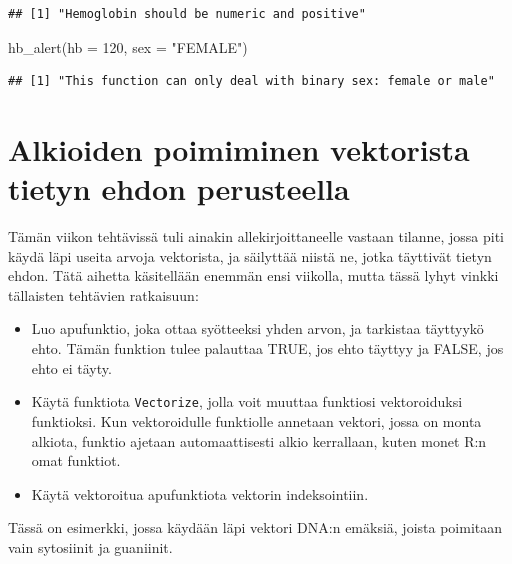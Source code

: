 \documentclass[
]{book}
\newenvironment{Shaded}{\begin{snugshade}}{\end{snugshade}}
\newcommand{\AttributeTok}[1]{\textcolor[rgb]{0.77,0.63,0.00}{#1}}
\newcommand{\DecValTok}[1]{\textcolor[rgb]{0.00,0.00,0.81}{#1}}
\newcommand{\FunctionTok}[1]{\textcolor[rgb]{0.00,0.00,0.00}{#1}}
\newcommand{\NormalTok}[1]{#1}
\newcommand{\StringTok}[1]{\textcolor[rgb]{0.31,0.60,0.02}{#1}}
\providecommand{\tightlist}{%
  \setlength{\itemsep}{0pt}\setlength{\parskip}{0pt}}
\begin{document}
\begin{verbatim}
## [1] "Hemoglobin should be numeric and positive"
\end{verbatim}

\begin{Shaded}
\begin{Highlighting}[]
\FunctionTok{hb\_alert}\NormalTok{(}\AttributeTok{hb =} \DecValTok{120}\NormalTok{, }\AttributeTok{sex =} \StringTok{"FEMALE"}\NormalTok{)}
\end{Highlighting}
\end{Shaded}

\begin{verbatim}
## [1] "This function can only deal with binary sex: female or male"
\end{verbatim}

\hypertarget{alkioiden-poimiminen-vektorista-tietyn-ehdon-perusteella}{%
\section{Alkioiden poimiminen vektorista tietyn ehdon perusteella}\label{alkioiden-poimiminen-vektorista-tietyn-ehdon-perusteella}}

Tämän viikon tehtävissä tuli ainakin allekirjoittaneelle vastaan tilanne, jossa piti käydä läpi useita arvoja vektorista, ja säilyttää niistä ne, jotka täyttivät tietyn ehdon. Tätä aihetta käsitellään enemmän ensi viikolla, mutta tässä lyhyt vinkki tällaisten tehtävien ratkaisuun:

\begin{itemize}
\tightlist
\item
  Luo apufunktio, joka ottaa syötteeksi yhden arvon, ja tarkistaa täyttyykö ehto. Tämän funktion tulee palauttaa TRUE, jos ehto täyttyy ja FALSE, jos ehto ei täyty.
\item
  Käytä funktiota \texttt{Vectorize}, jolla voit muuttaa funktiosi vektoroiduksi funktioksi. Kun vektoroidulle funktiolle annetaan vektori, jossa on monta alkiota, funktio ajetaan automaattisesti alkio kerrallaan, kuten monet R:n omat funktiot.
\item
  Käytä vektoroitua apufunktiota vektorin indeksointiin.
\end{itemize}

Tässä on esimerkki, jossa käydään läpi vektori DNA:n emäksiä, joista poimitaan vain sytosiinit ja guaniinit.
\end{document}

